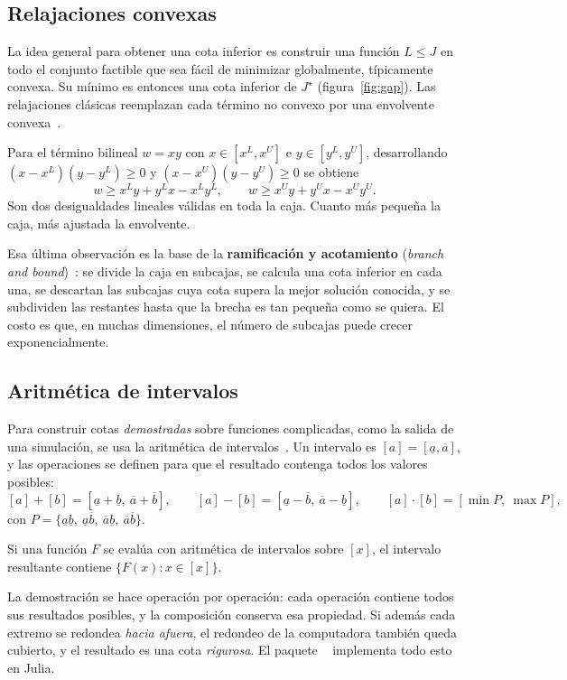 \subsection{Relajaciones convexas}
La idea general para obtener una cota inferior es construir una función $L\le J$ en todo el
conjunto factible que sea fácil de minimizar globalmente, típicamente convexa. Su mínimo es
entonces una cota inferior de $J^\star$ (figura~\ref{fig:gap}). Las relajaciones clásicas
reemplazan cada término no convexo por una envolvente convexa~\cite{mccormick1976}.

\begin{ejemplo}
Para el término bilineal $w=xy$ con $x\in[x^L,x^U]$ e $y\in[y^L,y^U]$, desarrollando
$(x-x^L)(y-y^L)\ge0$ y $(x-x^U)(y-y^U)\ge0$ se obtiene
\[
w\ge x^Ly+y^Lx-x^Ly^L,\qquad w\ge x^Uy+y^Ux-x^Uy^U .
\]
Son dos desigualdades lineales válidas en toda la caja. Cuanto más pequeña la caja, más ajustada
la envolvente.
\end{ejemplo}
\noindent Esa última observación es la base de la \textbf{ramificación y acotamiento}
(\emph{branch and bound})~\cite{horst1996}: se divide la caja en subcajas, se calcula una cota
inferior en cada una, se descartan las subcajas cuya cota supera la mejor solución conocida, y
se subdividen las restantes hasta que la brecha es tan pequeña como se quiera. El costo es que,
en muchas dimensiones, el número de subcajas puede crecer exponencialmente.

\subsection{Aritmética de intervalos}
Para construir cotas \emph{demostradas} sobre funciones complicadas, como la salida de una
simulación, se usa la aritmética de intervalos~\cite{moore2009}. Un intervalo es
$[a]=[\underline a,\overline a]$, y las operaciones se definen para que el resultado contenga
todos los valores posibles:
\[
[a]+[b]=[\underline a+\underline b,\ \overline a+\overline b],\qquad
[a]-[b]=[\underline a-\overline b,\ \overline a-\underline b],\qquad
[a]\cdot[b]=[\min P,\ \max P],
\]
con $P=\{\underline a\underline b,\ \underline a\overline b,\ \overline a\underline b,\ \overline a\overline b\}$.

\begin{proposicion}
Si una función $F$ se evalúa con aritmética de intervalos sobre $[x]$, el intervalo resultante
contiene $\{F(x):x\in[x]\}$.
\end{proposicion}
\noindent La demostración se hace operación por operación: cada operación contiene todos sus
resultados posibles, y la composición conserva esa propiedad. Si además cada extremo se redondea
\emph{hacia afuera}, el redondeo de la computadora también queda cubierto, y el resultado es una
cota \emph{rigurosa}. El paquete ~\cite{intervaljl} implementa todo
esto en Julia.

